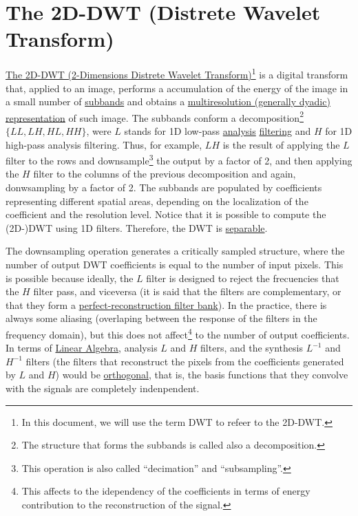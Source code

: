 
\section{The 2D-DWT (Distrete Wavelet Transform)}

\href{https://vicente-gonzalez-ruiz.github.io/image_transformations_for_coding/#x1-3100020}{The
  2D-DWT (2-Dimensions Distrete Wavelet Transform)\footnote{In this
    document, we will use the term DWT to refeer to the 2D-DWT.}} is a
digital transform that, applied to an image, performs a accumulation
of the energy of the image in a small number of
\href{https://en.wikipedia.org/wiki/Sub-band_coding}{subbands} and
obtains a
\href{https://vicente-gonzalez-ruiz.github.io/image_transformations_for_coding/index.html#x1-3500024}{multiresolution
  (generally dyadic) representation} of such image. The subbands
conform a decomposition\footnote{The structure that forms the subbands
  is called also a decomposition.}  $\{LL, LH, HL, HH\}$, were $L$
stands for 1D low-pass
\href{https://en.wikipedia.org/wiki/Filter_bank}{analysis}
\href{https://en.wikipedia.org/wiki/Filter_(signal_processing)}{filtering}
and $H$ for 1D high-pass analysis filtering. Thus, for example, $LH$
is the result of applying the $L$ filter to the rows and
downsample\footnote{This operation is also called ``decimation'' and
  ``subsampling''.} the output by a factor of 2, and then applying the
$H$ filter to the columns of the previous decomposition and again,
donwsampling by a factor of 2. The subbands are populated by
coefficients representing different spatial areas, depending on the
localization of the coefficient and the resolution level. Notice that
it is possible to compute the (2D-)DWT using 1D filters. Therefore,
the DWT is
\href{http://home.ustc.edu.cn/~xuedixiu/image.ustc/course/dip/DIP14-ch3.pdf}{separable}.

The downsampling operation generates a critically sampled structure,
where the number of output DWT coefficients is equal to the number of
input pixels. This is possible because ideally, the $L$ filter is
designed to reject the frecuencies that the $H$ filter pass, and
viceversa (it is said that the filters are complementary, or that they
form a
\href{https://en.wikipedia.org/wiki/Filter_bank#Perfect_reconstruction_filter_banks}{perfect-reconstruction
  filter bank}). In the practice, there is always some aliasing
(overlaping between the response of the filters in the frequency
domain), but this does not affect\footnote{This affects to the
  idependency of the coefficients in terms of energy contribution to
  the reconstruction of the signal.} to the number of output
coefficients. In terms of
\href{https://en.wikipedia.org/wiki/Linear_algebra}{Linear Algebra},
analysis $L$ and $H$ filters, and the synthesis $L^{-1}$ and $H^{-1}$
filters (the filters that reconstruct the pixels from the coefficients
generated by $L$ and $H$) would be
\href{https://en.wikipedia.org/wiki/Orthogonality}{orthogonal}, that
is, the basis functions that they convolve with the signals are
completely indenpendent.

